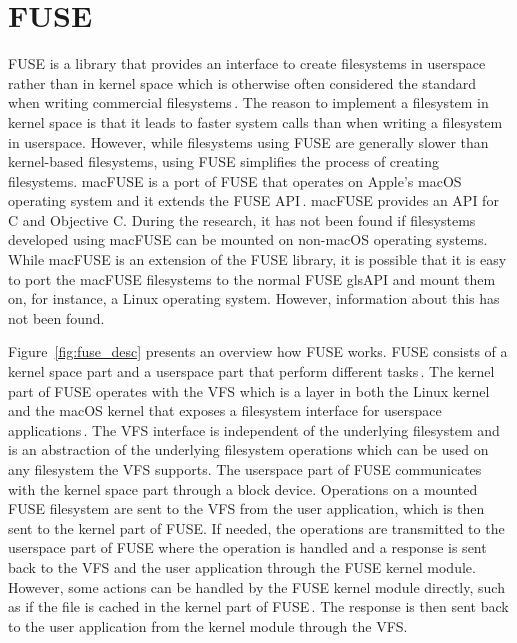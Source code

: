 \section{FUSE}
\gls{FUSE} is a library that provides an interface to create filesystems in userspace rather than in kernel space which is otherwise often considered the standard when writing commercial filesystems\,\cite{Libfuse2021}. The reason to implement a filesystem in kernel space is that it leads to faster system calls than when writing a filesystem in userspace. However, while filesystems using \gls{FUSE} are generally slower than \mbox{kernel-based} filesystems, using \gls{FUSE} simplifies the process of creating filesystems. macFUSE is a port of \gls{FUSE} that operates on Apple's macOS operating system and it extends the \gls{FUSE} \gls{API}\,\cite{HomeMacFUSE}. macFUSE provides an \gls{API} for C and Objective C. During the research, it has not been found if filesystems developed using macFUSE can be mounted on \mbox{non-macOS} operating systems. While macFUSE is an extension of the \gls{FUSE} library, it is possible that it is easy to port the macFUSE filesystems to the normal \gls{FUSE} gls{API} and mount them on, for instance, a Linux operating system. However, information about this has not been found.

Figure~\ref{fig:fuse_desc} presents an overview how \gls{FUSE} works. \gls{FUSE} consists of a kernel space part and a userspace part that perform different tasks\,\cite{vangoorFUSENotFUSE2017}. The kernel part of \gls{FUSE} operates with the \gls{VFS} which is a layer in both the Linux kernel and the macOS kernel that exposes a filesystem interface for userspace applications\,\cite{goochOverviewLinuxVirtual, singhMacOSInternals2006}. The \gls{VFS} interface is independent of the underlying filesystem and is an abstraction of the underlying filesystem operations which can be used on any filesystem the \gls{VFS} supports. The userspace part of \gls{FUSE} communicates with the kernel space part through a block device. Operations on a mounted \gls{FUSE} filesystem are sent to the \gls{VFS} from the user application, which is then sent to the kernel part of \gls{FUSE}. If needed, the operations are transmitted to the userspace part of \gls{FUSE} where the operation is handled and a response is sent back to the \gls{VFS} and the user application through the \gls{FUSE} kernel module. However, some actions can be handled by the \gls{FUSE} kernel module directly, such as if the file is cached in the kernel part of \gls{FUSE}\,\cite{vangoorFUSENotFUSE2017}. The response is then sent back to the user application from the kernel module through the \gls{VFS}.

